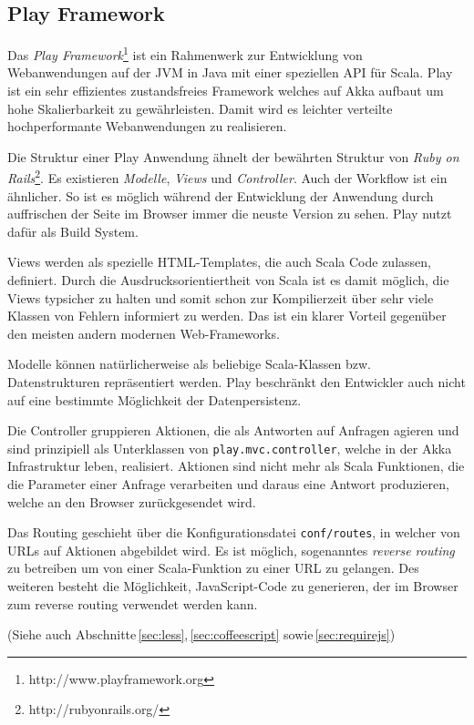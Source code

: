 \subsection{Play Framework}

Das \textit{Play Framework}\footnote{http://www.playframework.org} ist ein Rahmenwerk zur
Entwicklung von Webanwendungen auf der JVM in Java mit einer speziellen API für Scala. Play ist ein
sehr effizientes zustandsfreies Framework welches auf Akka aufbaut um hohe Skalierbarkeit zu
gewährleisten. Damit wird es leichter verteilte hochperformante Webanwendungen zu realisieren.

Die Struktur einer Play Anwendung ähnelt der bewährten Struktur von \textit{Ruby on
Rails}\footnote{http://rubyonrails.org/}. Es existieren \textit{Modelle}, \textit{Views} und
\textit{Controller}. Auch der Workflow ist ein ähnlicher. So ist es möglich während der
Entwicklung der Anwendung durch auffrischen der Seite im Browser immer die neuste Version zu sehen.
Play nutzt dafür  als Build System.

Views werden als spezielle HTML-Templates, die auch Scala Code zulassen, definiert. Durch die
Ausdrucksorientiertheit von Scala ist es damit möglich, die Views typsicher zu halten und somit
schon zur Kompilierzeit über sehr viele Klassen von Fehlern informiert zu werden. Das ist ein klarer
Vorteil gegenüber den meisten andern modernen Web-Frameworks.

Modelle können natürlicherweise als beliebige Scala-Klassen bzw. Datenstrukturen repräsentiert
werden. Play beschränkt den Entwickler auch nicht auf eine bestimmte Möglichkeit der
Datenpersistenz.

Die Controller gruppieren Aktionen, die als Antworten auf Anfragen agieren und sind prinzipiell
als Unterklassen von \texttt{play.mvc.controller}, welche in der Akka Infrastruktur leben,
realisiert. Aktionen sind nicht mehr als Scala Funktionen, die die Parameter einer Anfrage
verarbeiten und daraus eine Antwort produzieren, welche an den Browser zurückgesendet wird.

Das Routing geschieht über die Konfigurationsdatei \texttt{conf/routes}, in welcher von URLs auf
Aktionen abgebildet wird. Es ist möglich, sogenanntes \textit{reverse routing} zu betreiben um von
einer Scala-Funktion zu einer URL zu gelangen. Des weiteren besteht die Möglichkeit, JavaScript-Code 
zu generieren, der im Browser zum reverse routing verwendet werden kann.

(Siehe auch Abschnitte\,\ref{sec:less},\,\ref{sec:coffeescript} sowie\,\ref{sec:requirejs})

\label{sec:play}